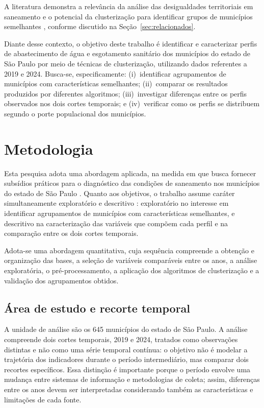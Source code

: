 \documentclass[12pt]{article}
\begin{document}
A literatura demonstra a relevância da análise das desigualdades territoriais em saneamento e o
potencial da clusterização para identificar grupos de municípios semelhantes
\cite{raupp2017,lima2025,lima2022}, conforme discutido na Seção~\ref{sec:relacionados}.

Diante desse contexto, o objetivo deste trabalho é identificar e caracterizar perfis de
abastecimento de água e esgotamento sanitário dos municípios do estado de São Paulo por meio de
técnicas de clusterização, utilizando dados referentes a 2019 e 2024. Busca-se, especificamente:
(i)~identificar agrupamentos de municípios com características semelhantes; (ii)~comparar os
resultados produzidos por diferentes algoritmos; (iii)~investigar diferenças entre os perfis
observados nos dois cortes temporais; e (iv)~verificar como os perfis se distribuem segundo o porte
populacional dos municípios.

\section{Metodologia}

Esta pesquisa adota uma abordagem aplicada, na medida em que busca fornecer subsídios práticos para
o diagnóstico das condições de saneamento nos municípios do estado de São Paulo \cite{gil2017}.
Quanto aos objetivos, o trabalho assume caráter simultaneamente exploratório e descritivo
\cite{mohajan2020}: exploratório no interesse em identificar agrupamentos de municípios com
características semelhantes, e descritivo na caracterização das variáveis que compõem cada perfil e
na comparação entre os dois cortes temporais.

Adota-se uma abordagem quantitativa, cuja sequência compreende a obtenção e organização das bases, a
seleção de variáveis comparáveis entre os anos, a análise exploratória, o pré-processamento, a
aplicação dos algoritmos de clusterização e a validação dos agrupamentos obtidos.

\subsection{Área de estudo e recorte temporal}

A unidade de análise são os 645 municípios do estado de São Paulo. A análise compreende dois cortes
temporais, 2019 e 2024, tratados como observações distintas e não como uma série temporal contínua:
o objetivo não é modelar a trajetória dos indicadores durante o período intermediário, mas comparar
dois recortes específicos. Essa distinção é importante porque o período envolve uma mudança entre
sistemas de informação e metodologias de coleta; assim, diferenças entre os anos devem ser
interpretadas considerando também as características e limitações de cada fonte.
\end{document}
